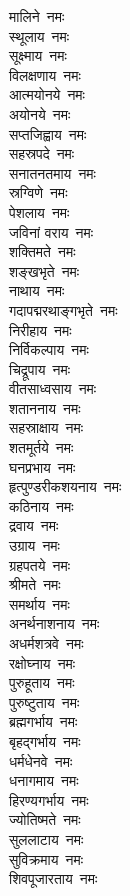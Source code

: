 \begin{multicols}{2}
\begin{flushleft}
मालिने~नमः\\
स्थूलाय~नमः\\
सूक्ष्माय~नमः\\
विलक्षणाय~नमः\\
आत्मयोनये~नमः\hfill{}\\
अयोनये~नमः\\
सप्तजिह्वाय~नमः\\
सहस्रपदे~नमः\\
सनातनतमाय~नमः\\
स्रग्विणे~नमः\\
पेशलाय~नमः\\
जविनां वराय~नमः\\
शक्तिमते~नमः\\
शङ्खभृते~नमः\\
नाथाय~नमः\hfill{}\\
गदापद्मरथाङ्गभृते~नमः\\
निरीहाय~नमः\\
निर्विकल्पाय~नमः\\
चिद्रूपाय~नमः\\
वीतसाध्वसाय~नमः\\
शताननाय~नमः\\
सहस्राक्षाय~नमः\\
शतमूर्तये~नमः\\
घनप्रभाय~नमः\\
हृत्पुण्डरीकशयनाय~नमः\hfill{}\\
कठिनाय~नमः\\
द्रवाय~नमः\\
उग्राय~नमः\\
ग्रहपतये~नमः\\
श्रीमते~नमः\\
समर्थाय~नमः\\
अनर्थनाशनाय~नमः\\
अधर्मशत्रवे~नमः\\
रक्षोघ्नाय~नमः\\
पुरुहूताय~नमः\hfill{}\\
पुरुष्टुताय~नमः\\
ब्रह्मगर्भाय~नमः\\
बृहद्गर्भाय~नमः\\
धर्मधेनवे~नमः\\
धनागमाय~नमः\\
हिरण्यगर्भाय~नमः\\
ज्योतिष्मते~नमः\\
सुललाटाय~नमः\\
सुविक्रमाय~नमः\\
शिवपूजारताय~नमः\hfill{}\\

\end{flushleft}
\end{multicols}
